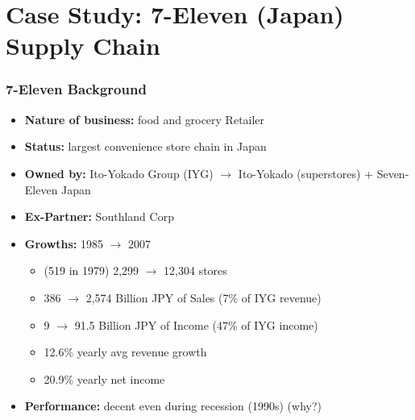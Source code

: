 \documentclass[10pt,handout,notes=show]{beamer}
\begin{document}
\section[7-Eleven]{Case Study: 7-Eleven (Japan) Supply Chain}
\begin{frame}
  \frametitle{7-Eleven Background}

    \begin{itemize}
      \item \textbf{Nature of business:} food and grocery Retailer
      \item \textbf{Status:} largest convenience store chain in Japan
      \item \textbf{Owned by:} Ito-Yokado Group (IYG) $\rightarrow$ Ito-Yokado (superstores) + Seven-Eleven Japan
      \item \textbf{Ex-Partner:} Southland Corp
      \item \textbf{Growths:} 1985 $\rightarrow$ 2007
      \begin{itemize}
        \item (519 in 1979) 2,299 $\rightarrow$ 12,304 stores
        \item 386 $\rightarrow$ 2,574 Billion JPY of Sales (7\% of IYG revenue)
        \item 9 $\rightarrow$ 91.5 Billion JPY of Income (47\% of IYG income)
        \item 12.6\% yearly avg revenue growth
        \item 20.9\%  yearly net income \NextHalfLine
      \end{itemize}
      \item \textbf{Performance:} decent even during recession (1990s) (why?)
    \end{itemize}




\end{frame}
\end{document}

